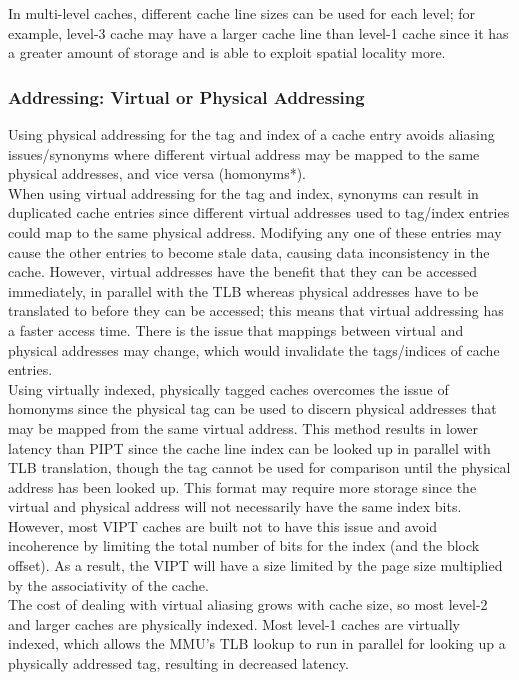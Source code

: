 \documentclass[a4paper, 12pt, oneside]{book}
\begin{document}
In multi-level caches, different cache line sizes can be used for each level; for example, level-3 cache may have a larger cache line than level-1 cache since it has a greater amount of storage and is able to exploit spatial locality more.

\subsubsection{Addressing: Virtual or Physical Addressing}
Using physical addressing for the tag and index of a cache entry avoids aliasing issues/synonyms where different virtual address may be mapped to the same physical addresses, and vice versa (homonyms*).\\

When using virtual addressing for the tag and index, synonyms can result in duplicated cache entries since different virtual addresses used to tag/index entries could map to the same physical address. Modifying any one of these entries may cause the other entries to become stale data, causing data inconsistency in the cache. However, virtual addresses have the benefit that they can be accessed immediately, in parallel with the TLB whereas physical addresses have to be translated to before they can be accessed; this means that virtual addressing has a faster access time. There is the issue that mappings between virtual and physical addresses may change, which would invalidate the tags/indices of cache entries.\\

Using virtually indexed, physically tagged caches overcomes the issue of homonyms since the physical tag can be used to discern physical addresses that may be mapped from the same virtual address. This method results in lower latency than PIPT since the cache line index can be looked up in parallel with TLB translation, though the tag cannot be used for comparison until the physical address has been looked up. This format may require more storage since the virtual and physical address will not necessarily have the same index bits. However, most VIPT caches are built not to have this issue and avoid incoherence by limiting the total number of bits for the index (and the block offset). As a result, the VIPT will have a size limited by the page size multiplied by the associativity of the cache.\\

The cost of dealing with virtual aliasing grows with cache size, so most level-2 and larger caches are physically indexed. Most level-1 caches are virtually indexed, which allows the MMU's TLB lookup to run in parallel for looking up a physically addressed tag, resulting in decreased latency.\\
\end{document}
